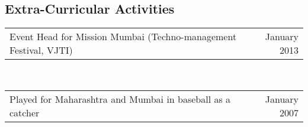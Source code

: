 \documentclass[margin,line]{res}
\begin{document}
\begin{resume}
\section {\sc \bf Extra-Curricular Activities}

\begin{tabular} {p{4.9in} r}
Event Head for Mission Mumbai (Techno-management Festival, VJTI) & January 2013\\
\end{tabular}\\
\begin{tabular}{p{4.9in} r}
Played for Maharashtra and Mumbai in baseball as a catcher & January 2007      
\end{tabular}

\end{resume}
\end{document}

